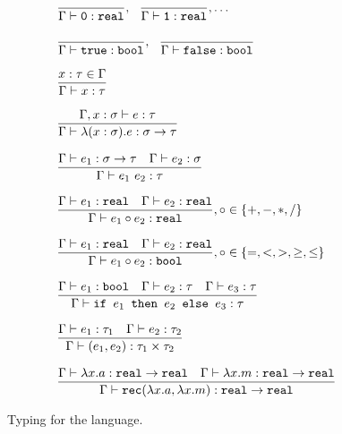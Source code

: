\begin{figure}
\[
\begin{array}{lr}
\dfrac{}{\Gamma \vdash \texttt{0}: \texttt{real}}, \ \ \dfrac{}{\Gamma \vdash \texttt{1}: \texttt{real}}, \ldots \\ \\
\dfrac{}{\Gamma \vdash \texttt{true} : \texttt{bool}}, \ \ \dfrac{}{\Gamma \vdash \texttt{false} : \texttt{bool}} \\  \\
\dfrac{x : \tau \in \Gamma}{\Gamma \vdash x : \tau } \\ \\ 
\dfrac{\Gamma, x : \sigma \vdash e : \tau}{\Gamma \vdash \lambda (x : \sigma).e : \sigma \rightarrow \tau } \\ \\
\dfrac{\Gamma \vdash e_1: \sigma \rightarrow \tau \ \ \ \Gamma \vdash e_2 : \sigma}{\Gamma \vdash e_1 \ e_2 : \tau} \\ \\
\dfrac{\Gamma \vdash e_1 : \texttt{real} \ \ \ \Gamma \vdash e_2 : \texttt{real}}{\Gamma \vdash e_1 \circ e_2 : \texttt{real}}
, \circ \in \{+,-,*,/\} \\ \\ 
\dfrac{\Gamma \vdash e_1 : \texttt{real} \ \ \ \Gamma \vdash e_2 : \texttt{real}}{\Gamma \vdash e_1 \circ e_2 : \texttt{bool}}
, \circ \in \{=, <, >, \geq, \leq\} \\ \\ 
\dfrac{\Gamma \vdash e_1 : \texttt{bool} \ \ \ \Gamma \vdash e_2 : \tau \ \ \ \Gamma \vdash e_3 : \tau}
{\Gamma \vdash \ifelse{e_1}{e_2}{e_3} : \tau} \\ \\ 
\dfrac{\Gamma \vdash e_1 : \tau_1 \ \ \ \Gamma \vdash e_2 : \tau_2}{\Gamma \vdash (e_1, e_2) : \tau_1 \times \tau_2} \\ \\
\dfrac{\Gamma \vdash \lambda x.a : \texttt{real} \rightarrow \texttt{real} \ \ \ \Gamma \vdash \lambda x.m : 
\texttt{real} \rightarrow \texttt{real}}
{\Gamma \vdash \texttt{rec}(\lambda x.a, \lambda x.m) : \texttt{real} \rightarrow \texttt{real}} 
\end{array}
\]
\caption{Typing for the language.}
\label{fig:typing}
\end{figure}

